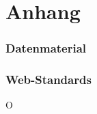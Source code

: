 \documentclass[paper=a4,fontsize=12pt,ngerman]{scrartcl}
\begin{document}
\clearpage
\renewcommand\refname{Literaturverzeichnis}




\clearpage
\appendix
\part*{Anhang}

\section{Datenmaterial}


\section{Web-Standards}
O
\end{document}
